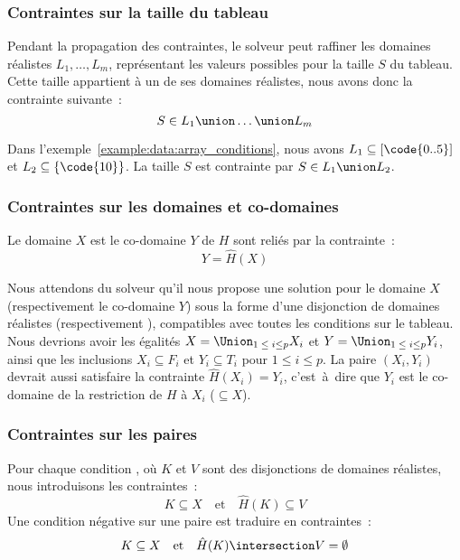 \subsubsection{Contraintes sur la taille du tableau}

Pendant la propagation des contraintes, le solveur peut raffiner les domaines
réalistes $L_1, \dots, L_m$, représentant les valeurs possibles pour la taille
$S$ du tableau. Cette taille appartient à un de ses domaines réalistes, nous
avons donc la contrainte suivante~:
%
$$S \in L_1 \union \dots \union L_m$$

Dans l'exemple~\ref{example:data:array_conditions}, nous avons $L_1 \subseteq
[\code{0..5}]$ et $L_2 \subseteq \{\code{10}\}$. La taille $S$ est contrainte
par $S \in L_1 \union L_2$.

\subsubsection{Contraintes sur les domaines et co-domaines}

Le domaine $X$ est le co-domaine $Y$ de $H$ sont reliés par la contrainte~:
%
$$Y = \hat{H}(X)$$

Nous attendons du solveur qu'il nous propose une solution pour le domaine $X$
(respectivement le co-domaine $Y$) sous la forme d'une disjonction de domaines
réalistes  (respectivement ), compatibles avec toutes les conditions sur le tableau. Nous
devrions avoir les égalités $X = \Union_{1 \;\leq\; i \leq p} X_i$ et $Y =
\Union_{1 \;\leq\; i \leq p} Y_i$, ainsi que les inclusions $X_i \subseteq F_i$
et $Y_i \subseteq T_i$ pour $1 \leq i \leq p$. La paire $(X_i, Y_i)$ devrait
aussi satisfaire la contrainte $\hat{H}(X_i) = Y_i$, c'est~à~dire que $Y_i$ est
le co-domaine de la restriction de $H$ à $X_i$ ($\subseteq X$).

\subsubsection{Contraintes sur les paires}

Pour chaque condition , où $K$ et $V$ sont des disjonctions de
domaines réalistes, nous introduisons les contraintes~:
%
$$K \subseteq X \quad\mathrm{et}\quad \hat{H}(K) \subseteq V$$
%
Une condition négative sur une paire  est traduire en
contraintes~:
%
$$K \subseteq X \quad\mathrm{et}\quad \hat{H}(K) \intersection V = \emptyset$$

